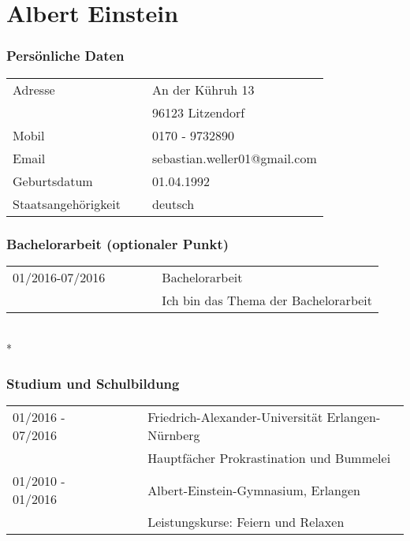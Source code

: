 

\chapter*{Albert Einstein}


\flushright
\subsection*{Persönliche Daten}
\flushleft
\normalsize
\begin{tabular}{lcl}
Adresse             & ~ & An der Kühruh 13\\
                    & ~ & 96123 Litzendorf\\[5pt]
Mobil               & ~ & 0170 - 9732890\\
Email               & ~ & sebastian.weller01@gmail.com\\[5pt]
Geburtsdatum        & ~ & 01.04.1992\\
Staatsangehörigkeit & ~ & deutsch\\
\end{tabular} 

\subsection*{Bachelorarbeit (optionaler Punkt)}
\begin{tabular}{lcl}
01/2016-07/2016     & ~~~~~ & Bachelorarbeit \\
                    & ~~~~~ & Ich bin das Thema der Bachelorarbeit\\[5pt]

\end{tabular} 
\\*  %

\nopagebreak
\subsection*{Studium und Schulbildung}
\begin{tabular}{lcl}
01/2016 - 07/2016     & ~~~ &  Friedrich-Alexander-Universität Erlangen-Nürnberg\\
                      & ~~~ &  Hauptfächer Prokrastination und Bummelei\\
01/2010 - 01/2016     & ~~~ &  Albert-Einstein-Gymnasium, Erlangen\\
                      & ~~~ &  Leistungskurse: Feiern und Relaxen\\
\end{tabular}

